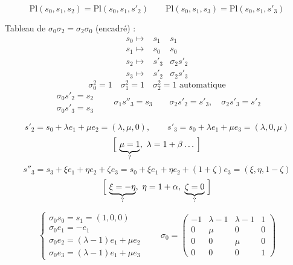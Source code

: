 \documentclass[11pt,a4paper]{article}
\begin{document}
\[
\boxed{\mathrm{Pl}(s_0, s_1, s_2) = \mathrm{Pl}(s_0, s_1, s'_2)}
\qquad
\boxed{\mathrm{Pl}(s_0, s_1, s_3) = \mathrm{Pl}(s_0, s_1, s'_3)}
\]

Tableau de $\sigma_0\sigma_2 = \sigma_2\sigma_0$ (encadré) :
\[
\begin{array}{l|ll}
s_0 \mapsto & s_1 & s_1 \\
s_1 \mapsto & s_0 & s_0 \\
s_2 \mapsto & s'_3 & \sigma_2 s'_2 \\
s_3 \mapsto & s'_2 & \sigma_2 s'_3
\end{array}
\]
\[
\boxed{\sigma_0^2 = 1} \quad \boxed{\sigma_1^2 = 1} \quad \sigma_2^2 = 1 \text{ automatique}
\]
\[
\boxed{\begin{array}{l} \sigma_0 s'_2 = s_2 \\ \sigma_0 s'_3 = s_3 \end{array}}
\qquad
\boxed{\sigma_1 s''_3 = s_3}
\qquad
\boxed{\sigma_2 s'_2 = s'_3}, \quad \sigma_2 s'_3 = s'_2
\]

\[
s'_2 = s_0 + \lambda e_1 + \mu e_2 = (\lambda, \mu, 0),
\qquad
s'_3 = s_0 + \lambda e_1 + \mu e_3 = (\lambda, 0, \mu)
\]
\[
\Bigl[\ \underbrace{\mu = 1}_{?},\ \lambda = 1 + \beta \ldots\ \Bigr]
\]
\[
s''_3 = s_3 + \xi e_1 + \eta e_2 + \zeta e_3 = s_0 + \xi e_1 + \eta e_2 + (1+\zeta)e_3 = (\xi, \eta, 1-\zeta)
\]
\[
\Bigl[\ \underbrace{\xi = -\eta}_{?},\ \eta = 1 + \alpha,\ \underbrace{\zeta = 0}_{?}\ \Bigr]
\]


\[
\begin{cases}
\sigma_0 s_0 = s_1 = (1,0,0) \\
\sigma_0 e_1 = -e_1 \\
\sigma_0 e_2 = (\lambda-1)e_1 + \mu e_2 \\
\sigma_0 e_3 = (\lambda-1)e_1 + \mu e_3
\end{cases}
\qquad
\sigma_0 = \begin{pmatrix}
-1 & \lambda-1 & \lambda-1 & 1 \\
0 & \mu & 0 & 0 \\
0 & 0 & \mu & 0 \\
0 & 0 & 0 & 1
\end{pmatrix}
\]
\end{document}
